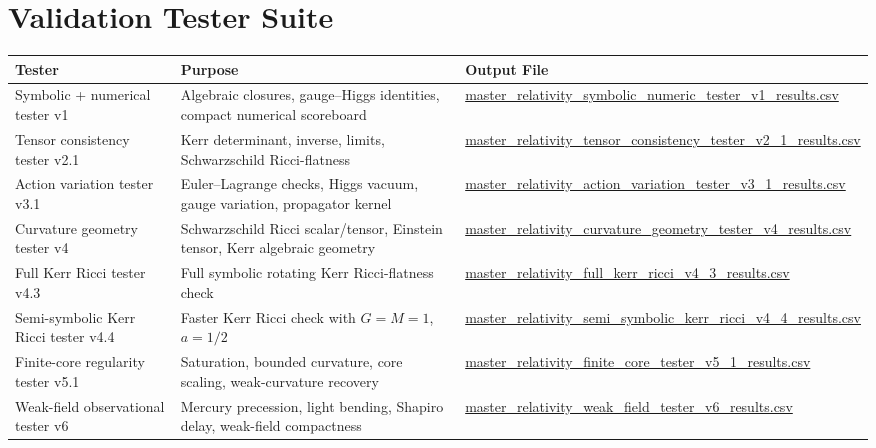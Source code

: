 \documentclass[11pt]{article}
\begin{document}
\section{Validation Tester Suite}
\begin{longtable}{>{\raggedright\arraybackslash}p{} >{\raggedright\arraybackslash}p{} >{\raggedright\arraybackslash\small}p{}}
\toprule
\textbf{Tester} & \textbf{Purpose} & \textbf{Output File} \\
\midrule
\endhead
Symbolic + numerical tester v1 & Algebraic closures, gauge--Higgs identities, compact numerical scoreboard & \url{master_relativity_symbolic_numeric_tester_v1_results.csv} \\ \addlinespace
Tensor consistency tester v2.1 & Kerr determinant, inverse, limits, Schwarzschild Ricci-flatness & \url{master_relativity_tensor_consistency_tester_v2_1_results.csv} \\ \addlinespace
Action variation tester v3.1 & Euler--Lagrange checks, Higgs vacuum, gauge variation, propagator kernel & \url{master_relativity_action_variation_tester_v3_1_results.csv} \\ \addlinespace
Curvature geometry tester v4 & Schwarzschild Ricci scalar/tensor, Einstein tensor, Kerr algebraic geometry & \url{master_relativity_curvature_geometry_tester_v4_results.csv} \\ \addlinespace
Full Kerr Ricci tester v4.3 & Full symbolic rotating Kerr Ricci-flatness check & \url{master_relativity_full_kerr_ricci_v4_3_results.csv} \\ \addlinespace
Semi-symbolic Kerr Ricci tester v4.4 & Faster Kerr Ricci check with $G=M=1$, $a=1/2$ & \url{master_relativity_semi_symbolic_kerr_ricci_v4_4_results.csv} \\ \addlinespace
Finite-core regularity tester v5.1 & Saturation, bounded curvature, core scaling, weak-curvature recovery & \url{master_relativity_finite_core_tester_v5_1_results.csv} \\ \addlinespace
Weak-field observational tester v6 & Mercury precession, light bending, Shapiro delay, weak-field compactness & \url{master_relativity_weak_field_tester_v6_results.csv} \\
\bottomrule
\end{longtable}
\end{document}
